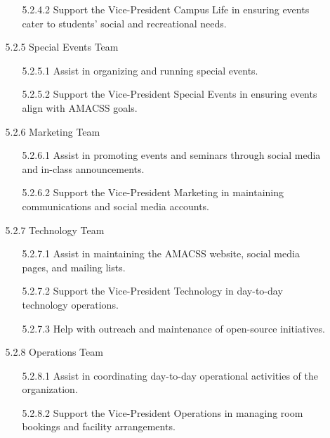 \documentclass[12pt,a4paper]{article}
\begin{document}
\begin{enumerate}
\begin{enumerate}
\begin{enumerate}
\item[5.2.4.2] Support the Vice-President Campus Life in ensuring events cater to students' social and recreational needs.
\end{enumerate}

\item[5.2.5] Special Events Team

\begin{enumerate}
\item[5.2.5.1] Assist in organizing and running special events.

\item[5.2.5.2] Support the Vice-President Special Events in ensuring events align with AMACSS goals.
\end{enumerate}

\item[5.2.6] Marketing Team

\begin{enumerate}
\item[5.2.6.1] Assist in promoting events and seminars through social media and in-class announcements.

\item[5.2.6.2] Support the Vice-President Marketing in maintaining communications and social media accounts.
\end{enumerate}

\item[5.2.7] Technology Team

\begin{enumerate}
\item[5.2.7.1] Assist in maintaining the AMACSS website, social media pages, and mailing lists.

\item[5.2.7.2] Support the Vice-President Technology in day-to-day technology operations.

\item[5.2.7.3] Help with outreach and maintenance of open-source initiatives.
\end{enumerate}

\item[5.2.8] Operations Team

\begin{enumerate}
\item[5.2.8.1] Assist in coordinating day-to-day operational activities of the organization.

\item[5.2.8.2] Support the Vice-President Operations in managing room bookings and facility arrangements.


\end{enumerate}
\end{enumerate}
\end{enumerate}
\end{document}
